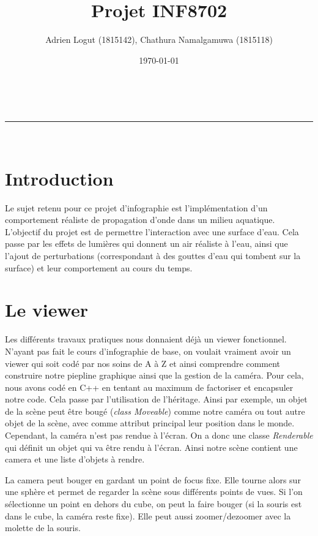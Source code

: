 \documentclass[a4paper,11pt,leqno]{article}
\makeatletter
\newcommand{\linia}{\rule{\linewidth}{0.5pt}}
\renewcommand{\maketitle}{
\begin{center}
\vspace{2ex}
{\huge \textsc{\@title}}
\vspace{1ex}
\\
\linia\\
\@author
\vspace{4ex}
\end{center}
}
\makeatother
\begin{document}
\renewcommand{\proofname}{Preuve}

\title{Projet INF8702}

\author{Adrien Logut (1815142), Chathura Namalgamuwa (1815118)}

\date{\today}

\maketitle

\section*{Introduction}

Le sujet retenu pour ce projet d'infographie est l'implémentation d'un comportement réaliste de propagation d'onde dans un milieu aquatique. L'objectif du projet est de permettre l'interaction avec une surface d'eau. Cela passe par les effets de lumières qui donnent un air réaliste à l'eau, ainsi que l'ajout de perturbations (correspondant à des gouttes d'eau qui tombent sur la surface) et leur comportement au cours du temps.

\section{Le viewer}

Les différents travaux pratiques nous donnaient déjà un viewer fonctionnel. N'ayant pas fait le cours d'infographie de base, on voulait vraiment avoir un viewer qui soit codé par nos soins de A à Z et ainsi comprendre comment construire notre piepline graphique ainsi que la gestion de la caméra. Pour cela, nous avons codé en C++ en tentant au maximum de factoriser et encapsuler notre code. Cela passe par l'utilisation de l'héritage. Ainsi par exemple, un objet de la scène peut être bougé (\emph{class Moveable}) comme notre caméra ou tout autre objet de la scène, avec comme attribut principal leur position dans le monde. Cependant, la caméra n'est pas rendue à l'écran. On a donc une classe \emph{Renderable} qui définit un objet qui va être rendu à l'écran. Ainsi notre scène contient une camera et une liste d'objets à rendre.

La camera peut bouger en gardant un point de focus fixe. Elle tourne alors sur une sphère et permet de regarder la scène sous différents points de vues. Si l'on sélectionne un point en dehors du cube, on peut la faire bouger (si la souris est dans le cube, la caméra reste fixe). Elle peut aussi zoomer/dezoomer avec la molette de la souris.
\end{document}
